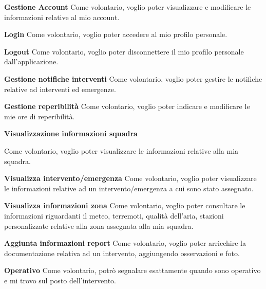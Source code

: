\textbf{Gestione Account}
Come volontario, voglio poter visualizzare e modificare le informazioni relative al mio account.

\textbf{Login}
Come volontario, voglio poter accedere al mio profilo personale.

\textbf{Logout}
Come volontario, voglio poter disconnettere il mio profilo personale dall'applicazione.

\textbf{Gestione notifiche interventi}
Come volontario, voglio poter gestire le notifiche relative ad interventi ed emergenze.

\textbf{Gestione reperibilità}
Come volontario, voglio poter indicare e modificare le mie ore di reperibilità.

\textbf{Visualizzazione informazioni squadra}

Come volontario, voglio poter visualizzare le informazioni relative alla mia squadra.

\textbf{Visualizza intervento/emergenza}
Come volontario, voglio poter visualizzare le informazioni relative ad un intervento/emergenza a cui sono stato assegnato.

\textbf{Visualizza informazioni zona}
Come volontario, voglio poter consultare le informazioni riguardanti il meteo, terremoti, qualità dell'aria, stazioni personalizzate relative alla zona assegnata alla mia squadra.

\textbf{Aggiunta informazioni report}
Come volontario, voglio poter arricchire la documentazione relativa ad un intervento, aggiungendo osservazioni e foto.

\textbf{Operativo}
Come volontario, potrò segnalare esattamente quando sono operativo e mi trovo sul posto dell'intervento. 